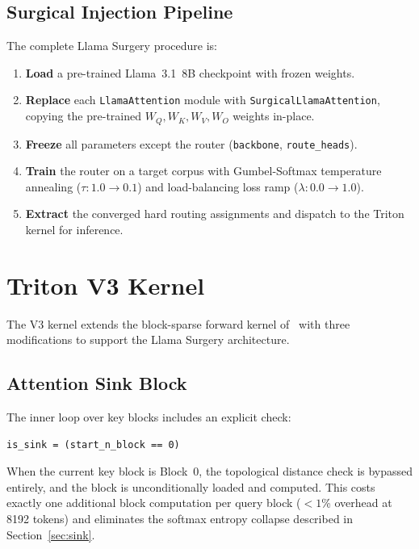 \documentclass[11pt,a4paper]{article}
\begin{document}
\subsection{Surgical Injection Pipeline}

The complete Llama Surgery procedure is:
\begin{enumerate}
    \item \textbf{Load} a pre-trained Llama~3.1~8B checkpoint with frozen weights.
    \item \textbf{Replace} each \texttt{LlamaAttention} module with \texttt{SurgicalLlamaAttention}, copying the pre-trained $W_Q, W_K, W_V, W_O$ weights in-place.
    \item \textbf{Freeze} all parameters except the router (\texttt{backbone}, \texttt{route\_heads}).
    \item \textbf{Train} the router on a target corpus with Gumbel-Softmax temperature annealing ($\tau: 1.0 \to 0.1$) and load-balancing loss ramp ($\lambda: 0.0 \to 1.0$).
    \item \textbf{Extract} the converged hard routing assignments and dispatch to the Triton kernel for inference.
\end{enumerate}

\section{Triton V3 Kernel}
\label{sec:triton}

The V3 kernel extends the block-sparse forward kernel of~\citet{learningtoskip2026} with three modifications to support the Llama Surgery architecture.

\subsection{Attention Sink Block}

The inner loop over key blocks includes an explicit check:
\begin{verbatim}
is_sink = (start_n_block == 0)
\end{verbatim}
When the current key block is Block~0, the topological distance check is bypassed entirely, and the block is unconditionally loaded and computed. This costs exactly one additional block computation per query block ($< 1$\% overhead at 8192 tokens) and eliminates the softmax entropy collapse described in Section~\ref{sec:sink}.
\end{document}
